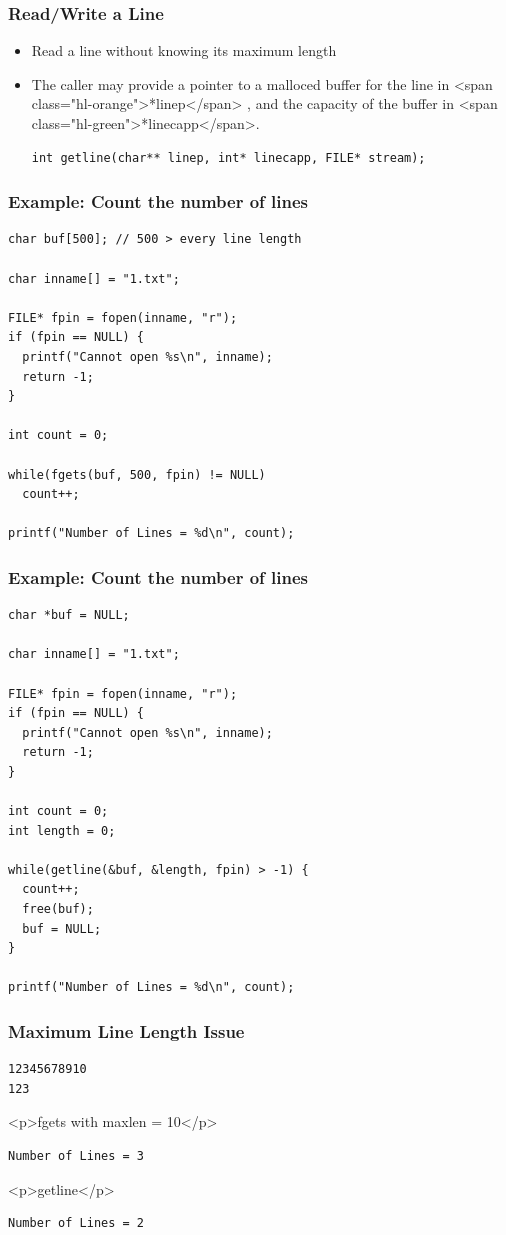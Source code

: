 \documentclass{../c-lecture}
\begin{document}
\begin{frame}
  \frametitle{Read/Write a Line}
  \begin{itemize}
    \item Read a line without knowing its maximum length
    \item
      The caller may provide a pointer to a malloced buffer for the line in
      <span class="hl-orange">*linep</span> , and the capacity of the buffer in
      <span class="hl-green">*linecapp</span>.

    \begin{verbatim}
int getline(char** linep, int* linecapp, FILE* stream);
    \end{verbatim}
  \end{itemize}
\end{frame}
\begin{frame}
  \frametitle{Example: Count the number of lines}
  \begin{verbatim}
char buf[500]; // 500 > every line length

char inname[] = "1.txt";

FILE* fpin = fopen(inname, "r");
if (fpin == NULL) {
  printf("Cannot open %s\n", inname);
  return -1;
}

int count = 0;

while(fgets(buf, 500, fpin) != NULL)
  count++;

printf("Number of Lines = %d\n", count);
  \end{verbatim}
\end{frame}
\begin{frame}
  \frametitle{Example: Count the number of lines}
  \begin{verbatim}
char *buf = NULL;

char inname[] = "1.txt";

FILE* fpin = fopen(inname, "r");
if (fpin == NULL) {
  printf("Cannot open %s\n", inname);
  return -1;
}

int count = 0;
int length = 0;

while(getline(&buf, &length, fpin) > -1) {
  count++;
  free(buf);
  buf = NULL;
}

printf("Number of Lines = %d\n", count);
  \end{verbatim}
\end{frame}
\begin{frame}
  \frametitle{Maximum Line Length Issue}
  \begin{verbatim}
12345678910
123
  \end{verbatim}
  <p>fgets with maxlen = 10</p>
  \begin{verbatim}
Number of Lines = 3
  \end{verbatim}
  <p>getline</p>
  \begin{verbatim}
Number of Lines = 2
  \end{verbatim}
\end{frame}
\end{document}
